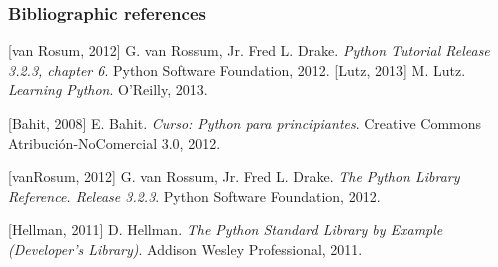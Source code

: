 \documentclass[10pt,compress]{beamer} %
\begin{document}
\begin{frame}
  \frametitle<presentation>{Bibliographic references}

  \begin{thebibliography}{2}
  
  \beamertemplatebookbibitems
   [van Rosum, 2012]
    G. van Rossum, Jr. Fred L. Drake.
    \newblock \emph{Python Tutorial Release 3.2.3, chapter 6}.
    \newblock Python Software Foundation, 2012. 
   [Lutz, 2013]
    M. Lutz.
    \newblock \emph{Learning Python}.
    \newblock O'Reilly, 2013.
    
     [Bahit, 2008]
     E. Bahit.
    \newblock \emph{Curso: Python para principiantes}.
    \newblock Creative Commons Atribución-NoComercial 3.0, 2012.
 \newpage
    
    [vanRosum, 2012]
    G. van Rossum, Jr. Fred L. Drake.
    \newblock \emph{The Python Library Reference. Release 3.2.3}.
    \newblock Python Software Foundation, 2012. 
    
    [Hellman, 2011]
     D. Hellman.
    \newblock \emph{The Python Standard Library by Example (Developer's Library)}.
    \newblock Addison Wesley Professional, 2011.
    
 

 
  \end{thebibliography}

\end{frame}
\end{document}
